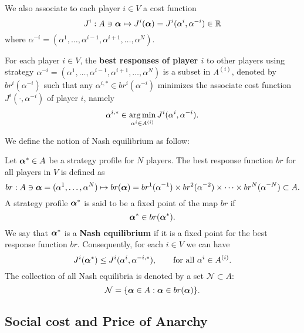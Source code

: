 We also associate to each player $i \in V$ a cost function 
$$
J^{i}: A \ni \boldsymbol{\alpha} \mapsto J^{i}(\boldsymbol{\alpha}) = J^{i}(\alpha^i, \alpha^{-i}) \in \mathbb{R}
$$ 
where $\alpha^{-i} =(\alpha^1, \ldots, \alpha^{i-1}, \alpha^{i+1}, \ldots,\alpha^N)$. 

\begin{definition}
	For each player $i \in V$, the \textbf{best responses of player $i$} to other players using strategy $\alpha^{-i} = (\alpha^1, \ldots, \alpha^{i-1}, \alpha^{i+1}, \ldots,\alpha^N)$ is a subset in $A^{(i)}$, denoted by $br^{i}(\alpha^{-i})$ such that any $\alpha^{i,*} \in br^{i}(\alpha^{-i})$ minimizes the associate cost function $J^{i}(\cdot, \alpha^{-i})$ of player $i$, namely
	\begin{equation}
	\alpha^{i,*} \in \operatorname*{arg\,min}_{\alpha^i \in A^{(i)}} J^{i}(\alpha^i, \alpha^{-i}).
	\end{equation}
\end{definition}

We define the notion of Nash equilibrium as follow:
\begin{definition}
	Let $\boldsymbol{\alpha}^* \in A$ be a strategy profile for $N$ players. The best response function $br$ for all players in $V$ is defined as
	\begin{equation}
	br: A \ni \boldsymbol{\alpha}=(\alpha^1, \ldots, \alpha^N) \mapsto br(\boldsymbol{\alpha}) = br^{1}(\alpha^{-1}) \times br^{2}(\alpha^{-2})\times \cdots \times br^{N}(\alpha^{-N}) \subset A.
	\end{equation}
	A strategy profile $\boldsymbol{\alpha}^*$ is said to be a fixed point of the map $br$ if  
	\begin{equation}
	\boldsymbol{\alpha}^*  \in br(\boldsymbol{\alpha}^*). 
	\end{equation}	
	We say that $\boldsymbol{\alpha}^*$ is a \textbf{Nash equilibrium} if it is a fixed point for the best response function $br$. Consequently, for each $i \in V$ we can have
	\begin{equation}
	J^i(\boldsymbol{\alpha}^*) \leq J^i(\alpha^i, \alpha^{-i,*}), \qquad \text{for all } \alpha^i \in A^{(i)}.
	\end{equation}
	The collection of all Nash equilibria is denoted by a set $\mathcal{N} \subset A$:
	\begin{equation}
	\mathcal{N} = \{ \boldsymbol{\alpha} \in A : \boldsymbol{\alpha} \in br(\boldsymbol{\alpha}) \}.
	\end{equation}
\end{definition}


\subsection{Social cost and Price of Anarchy}

